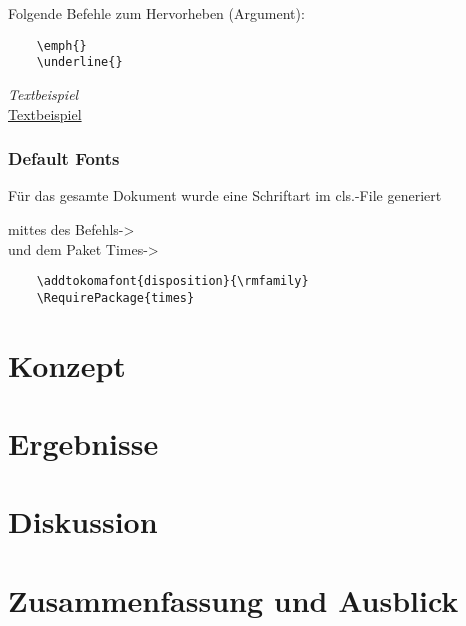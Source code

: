 \documentclass{like}
\begin{document}
\par\bigskip


Folgende Befehle zum Hervorheben (Argument):%

\begin{minipage}{0.2\textwidth}
	\begin{verbatim}
	\emph{}
	\underline{}
	\end{verbatim}
\end{minipage}\quad
\begin{minipage}{0.4\textwidth}
	\emph{Textbeispiel}\\
	\underline{Textbeispiel}
\end{minipage}
\subsection{Default Fonts}
Für das gesamte Dokument wurde eine Schriftart im cls.-File generiert\par\nopagebreak
\begin{minipage}[ht!]{0.4\textwidth}
	mittes des Befehls->\\
	und dem Paket Times->\\
\end{minipage}
\begin{minipage}[ht!]{0.4\textwidth}
	\vspace*{-.6cm}
	\begin{verbatim}
	\addtokomafont{disposition}{\rmfamily}
	\RequirePackage{times} 
	\end{verbatim}
\end{minipage}



\chapter{Konzept}



\chapter{Ergebnisse}




\chapter{Diskussion}

\chapter[Zusammenfassung]{Zusammenfassung und Ausblick}


\appendix





%



%


\end{document}
